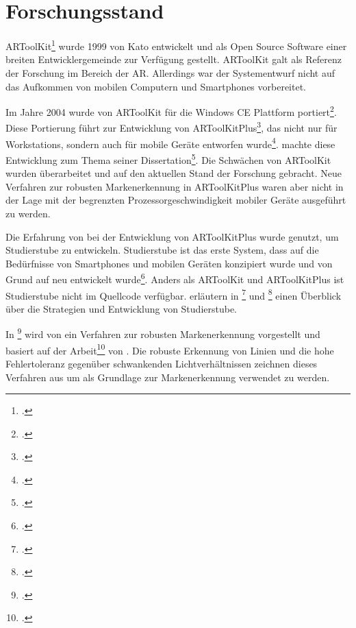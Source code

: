 \section{Forschungsstand} %
\label{sec:forschungsstand}
\begin{comment}
	Forschungsstand: Alle untersuchten Arbeiten aufführen und kurz erklären.
\end{comment}

ARToolKit\footcite{artoolkit} wurde 1999 von Kato entwickelt und als Open Source Software einer breiten
 Entwicklergemeinde zur Verfügung gestellt. ARToolKit galt als Referenz der Forschung im Bereich der \gls{AR}.
 Allerdings war der Systementwurf nicht auf das Aufkommen von mobilen Computern und Smartphones vorbereitet.

Im Jahre 2004 wurde von \citeauthor{wagner04} ARToolKit für die Windows CE Plattform portiert\footcite{wagner04}. Diese
 Portierung führt zur Entwicklung von ARToolKitPlus\footcite{artoolkitplus}, das nicht nur für Workstations, sondern
 auch für mobile Geräte entworfen wurde\footcite{wagner07b}. \citeauthor{wagner07a} machte diese Entwicklung zum Thema
 seiner Dissertation\footcite{wagner07a}. Die Schwächen von ARToolKit wurden überarbeitet und auf den aktuellen Stand
 der Forschung gebracht. Neue Verfahren zur robusten Mar\-ken\-er\-kennung in ARToolKitPlus waren aber
 nicht in der Lage mit der begrenzten Prozessorgeschwindigkeit mobiler Geräte ausgeführt zu werden.

Die Erfahrung von \citeauthor{wagner04} bei der Entwicklung von ARToolKitPlus wurde genutzt, um
 Studierstube zu entwickeln. Studierstube ist das erste System, dass auf die Bedürfnisse von Smartphones und mobilen
 Geräten konzipiert wurde und von Grund auf neu entwickelt wurde\footcite{studierstube}. Anders als ARToolKit und
 ARToolKitPlus ist Studierstube nicht im Quellcode verfügbar.
\citeauthor{wagner09a} erläutern in \footcite{wagner09a} und
 \footcite{wagner09b} einen Überblick über die Strategien und Entwicklung von Studierstube.

In \footcite{hirzer08} wird von \citeauthor{hirzer08} ein Verfahren zur robusten Markenerkennung
 vorgestellt und basiert auf der Arbeit\footcite{clarke96} von \citeauthor{clarke96}. Die robuste Erkennung von Linien
 und die hohe Fehlertoleranz gegenüber schwankenden Lichtverhältnissen zeichnen dieses Verfahren aus um als Grundlage
 zur Markenerkennung verwendet zu werden.

